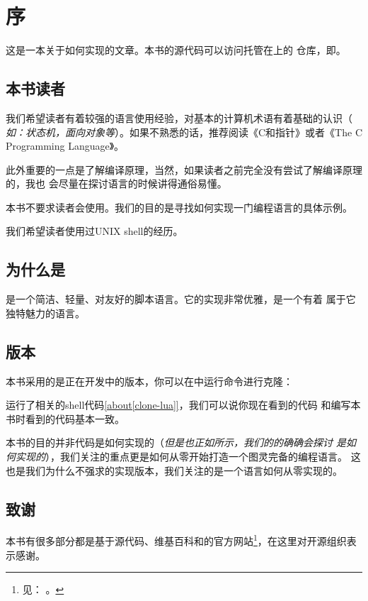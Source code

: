 

\chapter{序}

这是一本关于如何实现的文章。本书的源代码可以访问托管在上的
仓库，即。

\section{本书读者}

我们希望读者有着较强的语言使用经验，对基本的计算机术语有着基础的认识（\emph{%
如：状态机，面向对象等}）。如果不熟悉的话，推荐阅读《C和指针》或者《The C Programming
Language》。

此外重要的一点是了解编译原理，当然，如果读者之前完全没有尝试了解编译原理的，我也
会尽量在探讨语言的时候讲得通俗易懂。

本书不要求读者会使用。我们的目的是寻找如何实现一门编程语言的具体示例。

我们希望读者使用过UNIX shell的经历。

\section{为什么是}

是一个简洁、轻量、对友好的脚本语言。它的实现非常优雅，是一个有着
属于它独特魅力的语言。

\section{版本}

本书采用的是正在开发中的版本，你可以在中运行命令进行克隆：

运行了相关的shell代码\ref{about[clone-lua]}，我们可以说你现在看到的代码
和编写本书时看到的代码基本一致。

本书的目的并非代码是如何实现的（\emph{但是也正如所示，我们的的确确会探讨
是如何实现的}），我们关注的重点更是如何从零开始打造一个图灵完备的编程语言。
这也是我们为什么不强求的实现版本，我们关注的是一个语言如何从零实现的。

\section{致谢}

本书有很多部分都是基于源代码、维基百科和的官方网站\footnote{见：%
。}，在这里对开源组织表示感谢。

